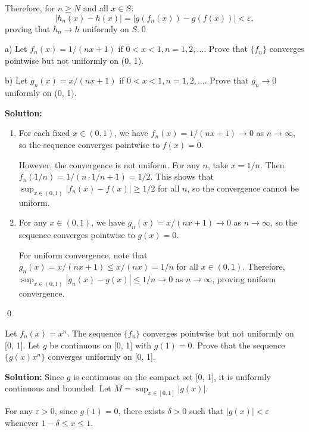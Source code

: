 Therefore, for \( n \geq N \) and all \( x \in S \):
\[|h_n(x) - h(x)| = |g(f_n(x)) - g(f(x))| < \varepsilon,\]
proving that \( h_n \to h \) uniformly on \( S \).\qed


\begin{problembox}
a) Let \( f_n(x) = 1/(nx + 1) \) if \( 0 < x < 1, n = 1, 2, \ldots \). Prove that \( \{f_n\} \) converges pointwise but not uniformly on (0, 1).

b) Let \( g_n(x) = x/(nx + 1) \) if \( 0 < x < 1, n = 1, 2, \ldots \). Prove that \( g_n \to 0 \) uniformly on (0, 1).
\end{problembox}

\bigskip\noindent\textbf{Solution:}
\begin{enumerate}[label=(\alph*)]
\item For each fixed \( x \in (0, 1) \), we have \( f_n(x) = 1/(nx + 1) \to 0 \) as \( n \to \infty \), so the sequence converges pointwise to \( f(x) = 0 \).

However, the convergence is not uniform. For any \( n \), take \( x = 1/n \). Then \( f_n(1/n) = 1/(n \cdot 1/n + 1) = 1/2 \). This shows that \( \sup_{x \in (0,1)} |f_n(x) - f(x)| \geq 1/2 \) for all \( n \), so the convergence cannot be uniform.

\item For any \( x \in (0, 1) \), we have \( g_n(x) = x/(nx + 1) \to 0 \) as \( n \to \infty \), so the sequence converges pointwise to \( g(x) = 0 \).

For uniform convergence, note that \( g_n(x) = x/(nx + 1) \leq x/(nx) = 1/n \) for all \( x \in (0, 1) \). Therefore, \( \sup_{x \in (0,1)} |g_n(x) - g(x)| \leq 1/n \to 0 \) as \( n \to \infty \), proving uniform convergence.
\end{enumerate}\qed


\begin{problembox}
Let \( f_n(x) = x^n \). The sequence \( \{f_n\} \) converges pointwise but not uniformly on [0, 1]. Let \( g \) be continuous on [0, 1] with \( g(1) = 0 \). Prove that the sequence \( \{g(x)x^n\} \) converges uniformly on [0, 1].
\end{problembox}

\bigskip\noindent\textbf{Solution:} Since \( g \) is continuous on the compact set [0, 1], it is uniformly continuous and bounded. Let \( M = \sup_{x \in [0,1]} |g(x)| \).

For any \( \varepsilon > 0 \), since \( g(1) = 0 \), there exists \( \delta > 0 \) such that \( |g(x)| < \varepsilon \) whenever \( 1 - \delta \leq x \leq 1 \).

